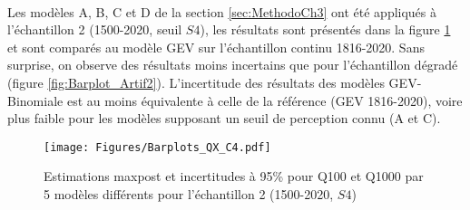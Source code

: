 \documentclass[11pt]{article}
\begin{document}
	\paragraph{} Les modèles A, B, C et D de la section \ref{sec:MethodoCh3} ont été appliqués à l'échantillon 2 (1500-2020, seuil $S4$), les résultats sont présentés dans la figure \ref{fig:BarplotC4} et sont comparés au modèle GEV sur l'échantillon continu 1816-2020. Sans surprise, on observe des résultats moins incertains que pour l'échantillon dégradé (figure \ref{fig:Barplot_Artif2}). L'incertitude des résultats des modèles GEV-Binomiale est au moins équivalente à celle de la référence (GEV 1816-2020), voire plus faible pour les modèles supposant un seuil de perception connu (A et C).

	\begin{figure}[h]
		\centering
		\texttt{[image: Figures/Barplots\_QX\_C4.pdf]}
		\caption{Estimations maxpost et incertitudes à 95\% pour Q100 et Q1000 par 5 modèles différents pour l'échantillon 2 (1500-2020, $S4$)}
		\label{fig:BarplotC4}
	\end{figure}
	
		\begin{table}[h]
	\centering
		\caption{Résultats maxpost et incertitudes des 5 modèles pour l'échantillon 2. Q100 et Q1000 représentent respectivement le débit des crues centennales et millénales, $\xi$ le paramètre de forme de la distribution GEV, $S$ le seuil de perception et $t*$ la date de début de la période historique. Les écarts type des distributions a posteriori sont représentés par les colonnes débutant par la lettre "u".}
		\label{tab:ResC4}
	\end{table}
	
\end{document}
